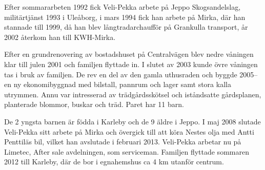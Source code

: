 Efter sommararbeten 1992 fick Veli-Pekka arbete på Jeppo Skogsandelslag, militärtjänst 1993 i Uleåborg, i mars 1994 fick han arbete på Mirka, där han stannade till 1999, då han blev långtradarchaufför på Grankulla transport, år 2002 återkom han till KWH-Mirka.

Efter en grundrenovering av bostadshuset på Centralvägen	blev nedre våningen klar till julen 2001 och familjen flyttade in. I slutet av 2003 kunde övre våningen tas i bruk av familjen.  De rev en del av den gamla uthusraden och byggde 2005-- en ny ekonomibyggnad med 	bilstall, pannrum och lager samt stora kalla utrymmen. Annu var intresserad av trädgårdsskötsel och iståndsatte gårdsplanen, planterade	blommor, buskar och träd. Paret har 11 barn.
\begin{jhchildren}
  \item {}
  \item {}
  \item {}
  \item {}
  \item {}
  \item {}
  \item {}
  \item {}
  \item {}
  \item {}
  \item {}
\end{jhchildren}
De 2 yngsta barnen är födda i Karleby och de 9 äldre i Jeppo. I maj 2008 slutade Veli-Pekka sitt arbete på Mirka och övergick till att köra Nestes olja med Antti Penttiläs bil, vilket han avslutade i februari 2013. Veli-Pekka arbetar nu på Limetec, After sale avdelningen, som serviceman. Familjen flyttade sommaren 2012 till Karleby, där de bor i 	egnahemshus ca 4 km utanför centrum.


\jhvspace{}


